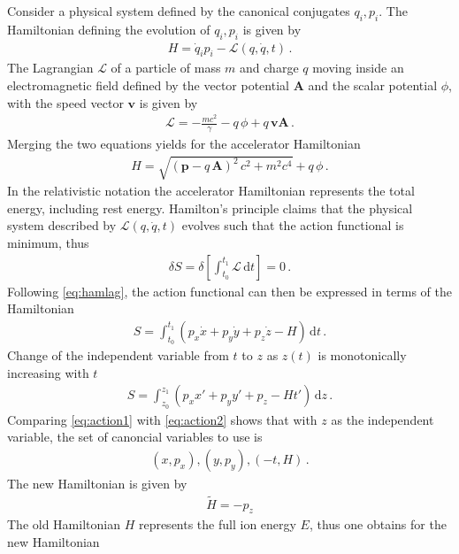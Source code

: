 Consider a physical system defined by the canonical conjugates $q_i,p_i$. The Hamiltonian defining the evolution of $q_i,p_i$ is given by~\cite{Proceedings1994zua}
\begin{align}
H = \dot{q}_i  p_i - \mathcal{L} (q,\dot{q},t)\,. \label{eq:hamlag}
\end{align}
The Lagrangian $\mathcal{L}$ of a particle of mass $m$ and charge $q$ moving inside an electromagnetic field defined by the vector potential $\mathbf{A}$ and the scalar potential $\phi$, with the speed vector $\mathbf{v}$ is given by
\begin{align}
\mathcal{L} = -\frac{m c^2}{\gamma} - q \, \phi + q \, \mathbf{v} \mathbf{A} \, . 
\end{align}
%
Merging the two equations yields for the accelerator Hamiltonian 	 
\begin{align}
H = \sqrt{(\mathbf{p}-q \, \mathbf{A})^2 \, c^2 + m^2 c^4} + q \, \phi \, .
\end{align}
In the relativistic notation the accelerator Hamiltonian represents the total energy, including rest energy. Hamilton's principle claims that the physical system described by $\mathcal{L}(q,\dot{q},t)$ evolves such that the action functional is minimum, thus~\cite{}
\begin{align}
\delta S = \delta \left[ \int_{t_0}^{t_1} \mathcal{L} \, \mathrm{d}t  \right] = 0 \, .
\end{align}
Following \eqref{eq:hamlag}, the action functional can then be expressed in terms of the Hamiltonian
\begin{align}
S = \int_{t_0}^{t_1} (p_x  \dot{x} + p_y  \dot{y} + p_z  \dot{z} - H) \, \mathrm{d}t \, . \label{eq:action1}
\end{align}
 Change of the independent variable from $t$ to $z$ as $z(t)$ is monotonically increasing with $t$
 \begin{align}
S = \int_{z_0}^{z_1} (p_x  x' + p_y  y' + p_z  - H t') \, \mathrm{d}z \, . \label{eq:action2}
\end{align}
%
Comparing \eqref{eq:action1} with \eqref{eq:action2} shows that with $z$ as the independent variable, the set of canoncial variables to use is
\begin{align}
(x,p_x) , (y,p_y), (-t,H) \, .
\end{align}
The new Hamiltonian is given by
\begin{align}
\tilde{H} = -p_z
\end{align}
%
The old Hamiltonian $H$ represents the full ion energy $E$, thus one obtains for the new Hamiltonian
